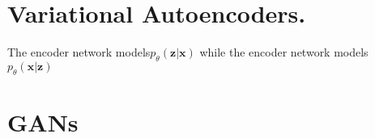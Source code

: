 \section{Variational Autoencoders.}
The encoder network models$p_\theta(\mathbf{z}|\mathbf{x})$ while the encoder network models $p_\theta(\mathbf{x}|\mathbf{z})$


\section{GANs}




%
%
%
